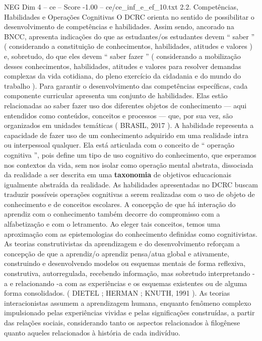 \begin{textsample}{NEG Dim 4 – ce – Score -1.00 – ce/ce\_inf\_e\_ef\_10.txt}  \label{ex:f4_neg_154}
2.2.
Competências, Habilidades e Operações Cognitivas O DCRC orienta no sentido de possibilitar o desenvolvimento de competências e habilidades.
Assim sendo, ancorado na BNCC, apresenta indicações do que as estudantes/os estudantes devem “ saber ” ( considerando a constituição de conhecimentos, habilidades, atitudes e valores ) e, sobretudo, do que eles devem “ saber fazer ” ( considerando a mobilização desses conhecimentos, habilidades, atitudes e valores para resolver demandas complexas da vida cotidiana, do pleno exercício da cidadania e do mundo do trabalho ).
Para garantir o desenvolvimento das competências específicas, cada componente curricular apresenta um conjunto de habilidades.
Elas estão relacionadas ao saber fazer uso dos diferentes objetos de conhecimento — aqui entendidos como conteúdos, conceitos e processos — que, por sua vez, são organizados em unidades temáticas ( BRASIL, 2017 ).
A habilidade representa a capacidade de fazer uso de um conhecimento adquirido em uma realidade intra ou interpessoal qualquer.
Ela está articulada com o conceito de “ operação cognitiva ”, pois define um tipo de uso cognitivo do conhecimento, que esperamos nos contextos da vida, sem nos isolar como operação mental abstrata, dissociada da realidade a ser descrita em uma \textbf{taxonomia} de objetivos educacionais igualmente abstraída da realidade.
As habilidades apresentadas no DCRC buscam traduzir possíveis operações cognitivas a serem realizadas com o uso de objeto de conhecimento e de conceitos escolares.
A concepção de que há interação do aprendiz com o conhecimento também decorre do compromisso com a alfabetização e com o letramento.
Ao eleger tais conceitos, temos uma aproximação com as epistemologias do conhecimento definidas como cognitivistas.
As teorias construtivistas da aprendizagem e do desenvolvimento reforçam a concepção de que a aprendiz/o aprendiz pensa/atua global e ativamente, construindo e desenvolvendo modelos ou esquemas mentais de forma reflexiva, construtiva, autorregulada, recebendo informação, mas sobretudo interpretando -a e relacionando -a com as experiências e os esquemas existentes ou de alguma forma consolidados. ( DIETEL ; HERMAN ; KNUTH, 1991 ).
As teorias interacionistas assumem a aprendizagem humana, enquanto fenômeno complexo impulsionado pelas experiências vividas e pelas significações construídas, a partir das relações sociais, considerando tanto os aspectos relacionados à filogênese quanto aqueles relacionados à história de cada indivíduo.

\end{textsample}
